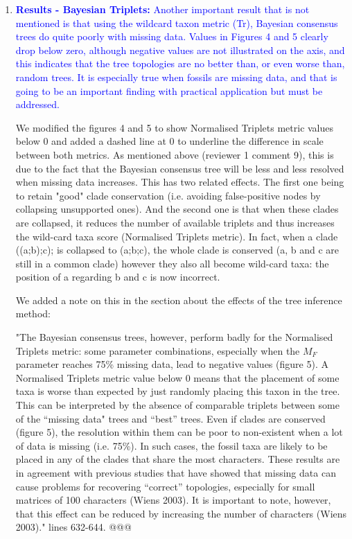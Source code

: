 \documentclass[12pt,letterpaper]{article}
\begin{document}
\begin{enumerate}
\item{\textcolor{blue}{\textbf{Results - Bayesian Triplets:} Another important result that is not mentioned is that using the wildcard taxon metric (Tr), Bayesian consensus trees do quite poorly with missing data.
Values in Figures 4 and 5 clearly drop below zero, although negative values are not illustrated on the axis, and this indicates that the tree topologies are no better than, or even worse than, random trees.
It is especially true when fossils are missing data, and that is going to be an important finding with practical application but must be addressed. }}

We modified the figures 4 and 5 to show Normalised Triplets metric values below 0 and added a dashed line at 0 to underline the difference in scale between both metrics.
As mentioned above (reviewer 1 comment 9), this is due to the fact that the Bayesian consensus tree will be less and less resolved when missing data increases.
This has two related effects.
The first one being to retain "good" clade conservation (i.e. avoiding false-positive nodes by collapsing unsupported ones).
And the second one is that when these clades are collapsed, it reduces the number of available triplets and thus increases the wild-card taxa score (Normalised Triplets metric).
In fact, when a clade ((a;b);c); is collapsed to (a;b;c), the whole clade is conserved (a, b and c are still in a common clade) however they also all become wild-card taxa: the position of a regarding b and c is now incorrect.

We added a note on this in the section about the effects of the tree inference method:

"The Bayesian consensus trees, however, perform badly for the Normalised Triplets metric: some parameter combinations, especially when the $M_F$ parameter reaches 75\% missing data, lead to negative values (figure 5).
A Normalised Triplets metric value below 0 means that the placement of some taxa is worse than expected by just randomly placing this taxon in the tree.
This can be interpreted by the absence of comparable triplets between some of the ``missing data" trees and ``best'' trees.
Even if clades are conserved (figure 5), the resolution within them can be poor to non-existent when a lot of data is missing (i.e. 75\%).
In such cases, the fossil taxa are likely to be placed in any of the clades that share the most characters.
These results are in agreement with previous studies that have showed that missing data can cause problems for recovering ``correct'' topologies, especially for small matrices of 100 characters (Wiens 2003).
It is important to note, however, that this effect can be reduced by increasing the number of characters (Wiens 2003)." lines 632-644. @@@




\end{enumerate}
\end{document}
